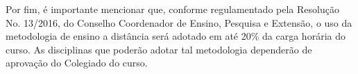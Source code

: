 Por fim, é importante mencionar que, conforme regulamentado pela Resolução No. 13/2016, do Conselho Coordenador de Ensino, Pesquisa e Extensão, o uso da metodologia de ensino a distância será adotado em até 20\% da carga horária do curso. As disciplinas que poderão adotar tal metodologia dependerão de aprovação do Colegiado do curso. 

